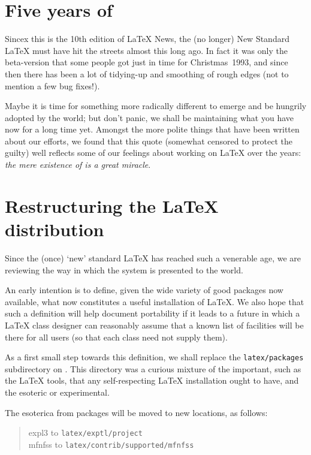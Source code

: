 \documentclass{ltnews}
\providecommand\file[1]{\texttt{#1}}
\begin{document}
\maketitle


\section{Five years of \LaTeXe}

Sincex this is the 10th edition of \LaTeX{} News, the (no longer) New
Standard \LaTeX{} must have hit the streets almost this long ago.  In
fact it was only the beta-version that some people got just in time for
Christmas~1993, and since then there has been a lot of tidying-up and
smoothing of rough edges (not to mention a few bug fixes!).

Maybe it is time for something more radically different to emerge and
be hungrily adopted by the world; but don't panic, we shall be
maintaining what you have now for a long time yet.  Amongst the more
polite things that have been written about our efforts, we found that this
quote (somewhat censored to protect the guilty) well reflects some of
our feelings about working on \LaTeX{} over the years: \textit{the mere
existence of \LaTeXe{} is a great miracle}.


  \section{Restructuring the \LaTeX{} distribution}

  Since the (once) `new' standard \LaTeX{} has reached such a venerable
  age, we are reviewing the way in which the system is presented to the
  world.

  An early intention is to define, given the wide variety of good
  packages now available, what now constitutes a useful installation of
  \LaTeX{}. We also hope that such a definition will help document
  portability if it leads to a future in which a \LaTeX{} class
  designer can reasonably assume that a known list of
  facilities will be there for all users (so that each class
  need not supply them).

  As a first small step towards this definition, we shall replace the
  \file{latex/packages} subdirectory on \ctan{}.
  This directory was a curious mixture of the important, such as the
  \LaTeX{} \textsf{tools}, that any self-respecting \LaTeX{}
  installation ought to have, and the esoteric or experimental.

  The esoterica from \textsf{packages} will be moved to
  new locations, as follows:
  \begin{quote}
    \textsf{expl3}  to \file{latex/exptl/project}\\
    \textsf{mfnfss} to \file{latex/contrib/supported/mfnfss}
  \end{quote}
\end{document}
